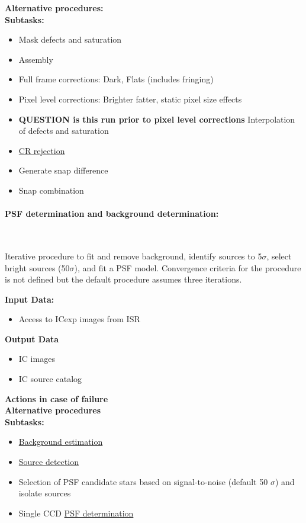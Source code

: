\noindent 
{\bf Alternative procedures:}\\

\noindent
{\bf Subtasks:}
\begin{itemize}
\item Mask defects and saturation
\item Assembly
\item Full frame corrections: Dark, Flats (includes fringing)
\item Pixel level corrections: Brighter fatter, static pixel size effects
\item {\bf QUESTION is this run prior to pixel level corrections} Interpolation of defects and saturation
\item \hyperref[sec:artifact]{CR rejection}
\item Generate snap difference
\item Snap combination
\end{itemize}


\paragraph{PSF determination and background determination:}~

Iterative procedure to fit and remove background, identify sources to
5$\sigma$, select bright sources (50$\sigma$), and fit a PSF
model. Convergence criteria for the procedure is not defined but the
default procedure assumes three iterations.

\noindent
{\bf Input Data:}
\begin{itemize}
\item Access to ICexp images from ISR 
\end{itemize}
{\bf Output Data}
\begin{itemize}
\item IC images 
\item IC source catalog 
\end{itemize}
 {\bf Actions in case of failure}\\
{\bf Alternative procedures}\\

\noindent
{\bf Subtasks:}


\begin{itemize}
\item \hyperref[sec:acBackgroundEstimation]{Background estimation}
\item \hyperref[sec:acSourceDetection]{Source detection}
\item Selection of PSF candidate stars based on signal-to-noise
  (default 50 $\sigma$) and isolate sources
\item Single CCD \hyperref[sec:acSingleCCDPSF]{PSF determination}
\end{itemize}

